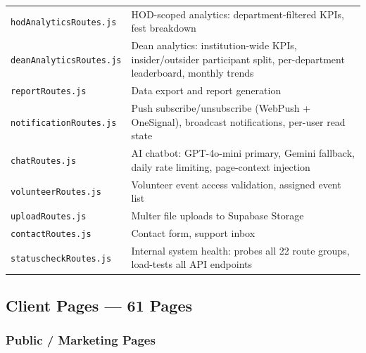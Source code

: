 \documentclass[12pt,a4paper]{article}
\begin{document}
\begin{longtable}{L{4.5cm} X}
\addlinespace
\texttt{hodAnalyticsRoutes.js} & HOD-scoped analytics: department-filtered KPIs, fest breakdown \\
\addlinespace
\texttt{deanAnalyticsRoutes.js} & Dean analytics: institution-wide KPIs, insider/outsider participant split, per-department leaderboard, monthly trends \\
\addlinespace
\texttt{reportRoutes.js} & Data export and report generation \\
\addlinespace
\texttt{notificationRoutes.js} & Push subscribe/unsubscribe (WebPush + OneSignal), broadcast notifications, per-user read state \\
\addlinespace
\texttt{chatRoutes.js} & AI chatbot: GPT-4o-mini primary, Gemini fallback, daily rate limiting, page-context injection \\
\addlinespace
\texttt{volunteerRoutes.js} & Volunteer event access validation, assigned event list \\
\addlinespace
\texttt{uploadRoutes.js} & Multer file uploads to Supabase Storage \\
\addlinespace
\texttt{contactRoutes.js} & Contact form, support inbox \\
\addlinespace
\texttt{statuscheckRoutes.js} & Internal system health: probes all 22 route groups, load-tests all API endpoints \\
\bottomrule
\end{longtable}

\subsection{Client Pages — 61 Pages}

\subsubsection{Public / Marketing Pages}
\end{document}
